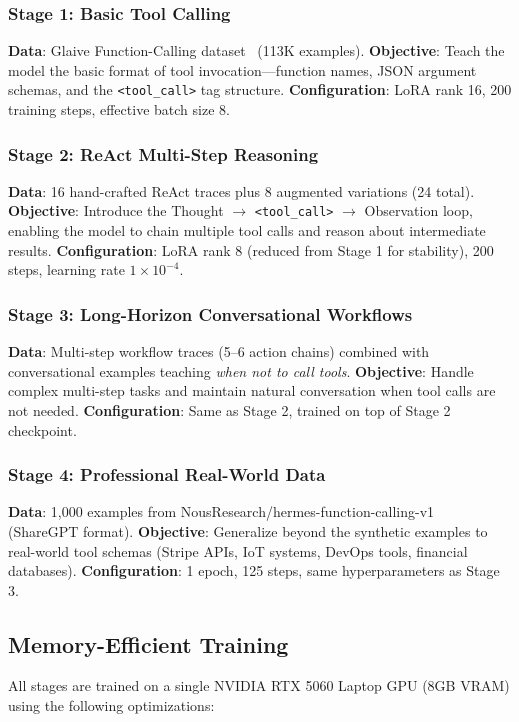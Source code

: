 \documentclass[conference]{IEEEtran}
\begin{document}
\subsubsection{Stage 1: Basic Tool Calling}
\textbf{Data}: Glaive Function-Calling dataset~\cite{glaive2023} (113K examples).
\textbf{Objective}: Teach the model the basic format of tool invocation---function names, JSON argument schemas, and the \texttt{<tool\_call>} tag structure.
\textbf{Configuration}: LoRA rank 16, 200 training steps, effective batch size 8.

\subsubsection{Stage 2: ReAct Multi-Step Reasoning}
\textbf{Data}: 16 hand-crafted ReAct traces plus 8 augmented variations (24 total).
\textbf{Objective}: Introduce the Thought $\rightarrow$ \texttt{<tool\_call>} $\rightarrow$ Observation loop, enabling the model to chain multiple tool calls and reason about intermediate results.
\textbf{Configuration}: LoRA rank 8 (reduced from Stage 1 for stability), 200 steps, learning rate $1 \times 10^{-4}$.

\subsubsection{Stage 3: Long-Horizon Conversational Workflows}
\textbf{Data}: Multi-step workflow traces (5--6 action chains) combined with conversational examples teaching \textit{when not to call tools}.
\textbf{Objective}: Handle complex multi-step tasks and maintain natural conversation when tool calls are not needed.
\textbf{Configuration}: Same as Stage 2, trained on top of Stage 2 checkpoint.

\subsubsection{Stage 4: Professional Real-World Data}
\textbf{Data}: 1,000 examples from NousResearch/hermes-function-calling-v1~\cite{nousresearch2024hermes} (ShareGPT format).
\textbf{Objective}: Generalize beyond the synthetic examples to real-world tool schemas (Stripe APIs, IoT systems, DevOps tools, financial databases).
\textbf{Configuration}: 1 epoch, 125 steps, same hyperparameters as Stage 3.

\subsection{Memory-Efficient Training}
All stages are trained on a single NVIDIA RTX 5060 Laptop GPU (8GB VRAM) using the following optimizations:
\end{document}
